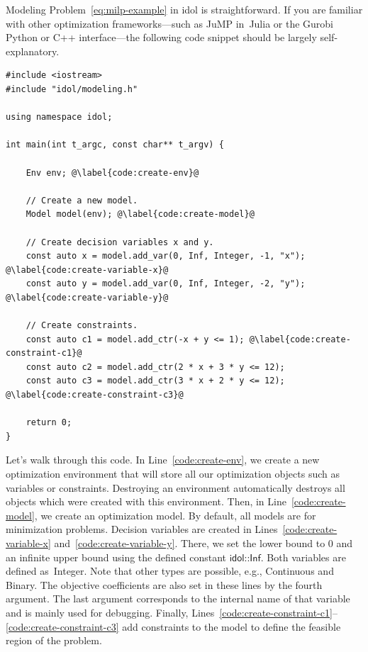 Modeling Problem~\eqref{eq:milp-example} in \textsf{idol} is straightforward.
If you are familiar with other optimization frameworks---such as \textsf{JuMP}
in~\textsf{Julia} or the \textsf{Gurobi} \textsf{Python} or \textsf{C++}
interface---the following code snippet should be largely self-explanatory.
%
\begin{lstlisting}
#include <iostream>
#include "idol/modeling.h"

using namespace idol;

int main(int t_argc, const char** t_argv) {

    Env env; @\label{code:create-env}@

    // Create a new model.
    Model model(env); @\label{code:create-model}@

    // Create decision variables x and y.
    const auto x = model.add_var(0, Inf, Integer, -1, "x"); @\label{code:create-variable-x}@
    const auto y = model.add_var(0, Inf, Integer, -2, "y"); @\label{code:create-variable-y}@

    // Create constraints.
    const auto c1 = model.add_ctr(-x + y <= 1); @\label{code:create-constraint-c1}@
    const auto c2 = model.add_ctr(2 * x + 3 * y <= 12);
    const auto c3 = model.add_ctr(3 * x + 2 * y <= 12); @\label{code:create-constraint-c3}@

    return 0;
}

\end{lstlisting}

Let's walk through this code. In Line~\ref{code:create-env}, we create a new
optimization environment that will store all our optimization objects such as
variables or constraints. Destroying an environment automatically destroys all
objects which were created with this environment. Then, in
Line~\ref{code:create-model}, we create an optimization model. By default, all
models are for minimization problems. Decision variables are created in
Lines~\ref{code:create-variable-x} and~\ref{code:create-variable-y}. There, we
set the lower bound to 0 and an infinite upper bound using the defined
constant $\textsf{idol::Inf}$. Both variables are defined as~\textsf{Integer}.
Note that other types are possible, e.g., \textsf{Continuous} and
\textsf{Binary}. The objective coefficients are also set in these lines by the
fourth argument. The last argument corresponds to the internal name of that
variable and is mainly used for debugging. Finally,
Lines~\ref{code:create-constraint-c1}--\ref{code:create-constraint-c3} add
constraints to the model to define the feasible region of the problem.

